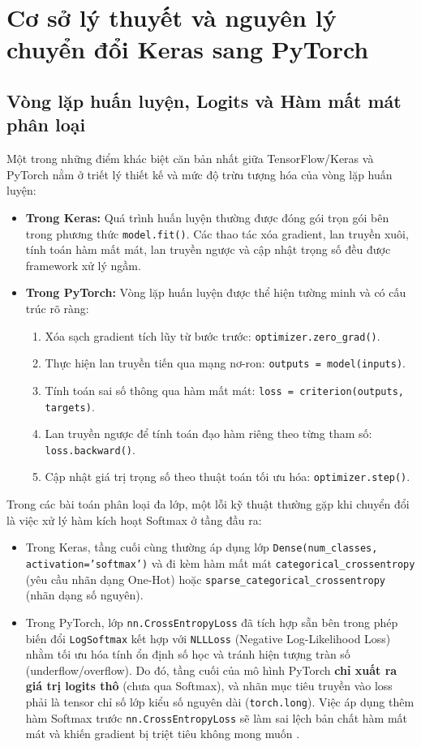 \chapter{Cơ sở lý thuyết và nguyên lý chuyển đổi Keras sang PyTorch}

\section{Vòng lặp huấn luyện, Logits và Hàm mất mát phân loại}
Một trong những điểm khác biệt căn bản nhất giữa TensorFlow/Keras và PyTorch nằm ở triết lý thiết kế và mức độ trừu tượng hóa của vòng lặp huấn luyện:
\begin{itemize}
\item \textbf{Trong Keras:} Quá trình huấn luyện thường được đóng gói trọn gói bên trong phương thức \texttt{model.fit()}. Các thao tác xóa gradient, lan truyền xuôi, tính toán hàm mất mát, lan truyền ngược và cập nhật trọng số đều được framework xử lý ngầm.
\item \textbf{Trong PyTorch:} Vòng lặp huấn luyện được thể hiện tường minh và có cấu trúc rõ ràng:
\begin{enumerate}[label=\alph*.]
\item Xóa sạch gradient tích lũy từ bước trước: \texttt{optimizer.zero\_grad()}.
\item Thực hiện lan truyền tiến qua mạng nơ-ron: \texttt{outputs = model(inputs)}.
\item Tính toán sai số thông qua hàm mất mát: \texttt{loss = criterion(outputs, targets)}.
\item Lan truyền ngược để tính toán đạo hàm riêng theo từng tham số: \texttt{loss.backward()}.
\item Cập nhật giá trị trọng số theo thuật toán tối ưu hóa: \texttt{optimizer.step()}.
\end{enumerate}
\end{itemize}

Trong các bài toán phân loại đa lớp, một lỗi kỹ thuật thường gặp khi chuyển đổi là việc xử lý hàm kích hoạt Softmax ở tầng đầu ra:
\begin{itemize}
\item Trong Keras, tầng cuối cùng thường áp dụng lớp \texttt{Dense(num\_classes, activation='softmax')} và đi kèm hàm mất mát \texttt{categorical\_crossentropy} (yêu cầu nhãn dạng One-Hot) hoặc \texttt{sparse\_categorical\_crossentropy} (nhãn dạng số nguyên).
\item Trong PyTorch, lớp \texttt{nn.CrossEntropyLoss} đã tích hợp sẵn bên trong phép biến đổi \texttt{LogSoftmax} kết hợp với \texttt{NLLLoss} (Negative Log-Likelihood Loss) nhằm tối ưu hóa tính ổn định số học và tránh hiện tượng tràn số (underflow/overflow). Do đó, tầng cuối của mô hình PyTorch \textbf{chỉ xuất ra giá trị logits thô} (chưa qua Softmax), và nhãn mục tiêu truyền vào loss phải là tensor chỉ số lớp kiểu số nguyên dài (\texttt{torch.long}). Việc áp dụng thêm hàm Softmax trước \texttt{nn.CrossEntropyLoss} sẽ làm sai lệch bản chất hàm mất mát và khiến gradient bị triệt tiêu không mong muốn \cite{paszke2019pytorch}.
\end{itemize}


